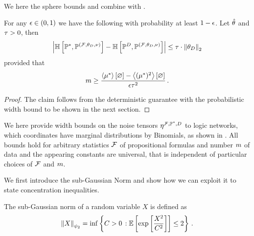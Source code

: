 
%
We here the sphere bounds and combine with .

\begin{theorem}
    For any $\epsilon\in(0,1)$ we have the following with probability at least $1-\epsilon$.
    Let $\hat{\theta}$ and $\tau>0$, then
    \[ \left|\mathbb{H}\left[\mathbb{P}^*,\mathbb{P}^{(\mathcal{F},\theta_{D},\nu)}\right] - \mathbb{H}\left[\mathbb{P}^{D},\mathbb{P}^{(\mathcal{F},\theta_{D},\nu)}\right]\right| \leq \tau \cdot \left\|\theta_{D}\right\|_{2} \]
    provided that
    \[ m \geq \frac{\left\langle \mu^*\right\rangle \left[ \varnothing \right]-\left\langle (\mu^*)^2\right\rangle \left[ \varnothing \right]}{\epsilon \tau^2} \, . \]
\end{theorem}
\begin{proof}
    The claim follows from the deterministic guarantee  with the probabilistic width bound  to be shown in the next section.
\end{proof}




\label{sec:widthBounds}

We here provide width bounds on the noise tensors $\eta^{\mathcal{F},\mathbb{P}^*,D}$ to logic networks, which coordinates have marginal distributions by Binomials, as shown in .
All bounds hold for arbitrary statistics $\mathcal{F}$ of propositional formulas and number $m$ of data and the appearing constants are universal, that is independent of particular choices of $\mathcal{F}$ and $m$.


We first introduce the sub-Gaussian Norm and show how we can exploit it to state concentration inequalities.

\begin{definition}
    The sub-Gaussian norm of a random variable $X$ is defined as
    \begin{align*}
        \left\|X\right\|_{\psi_2} = \inf \left\{ C > 0 \, : \mathbb{E}\left[\mathrm{exp}\left[\frac{X^2}{C^2}\right]\right] \leq 2 \right\} \, .
    \end{align*}
\end{definition}

